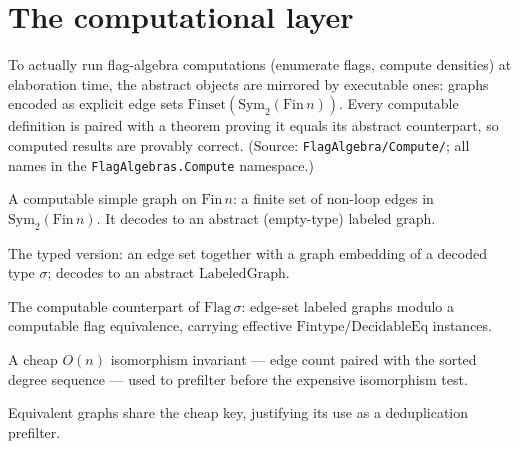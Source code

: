 \chapter{The computational layer}
\label{chap:compute}

To actually run flag-algebra computations (enumerate flags, compute densities) at
elaboration time, the abstract objects are mirrored by executable ones: graphs
encoded as explicit edge sets $\mathrm{Finset}(\mathrm{Sym}_2(\mathrm{Fin}\,n))$.
Every computable definition is paired with a theorem proving it equals its
abstract counterpart, so computed results are provably correct. (Source:
\texttt{FlagAlgebra/Compute/}; all names in the \texttt{FlagAlgebras.Compute}
namespace.)

\begin{definition}
  \label{def:sym2-graph}
  \leanok
  A computable simple graph on $\mathrm{Fin}\,n$: a finite set of non-loop edges
  in $\mathrm{Sym}_2(\mathrm{Fin}\,n)$. It decodes to an abstract
  (empty-type) labeled graph.
\end{definition}

\begin{definition}
  \label{def:sym2-labeled-graph}
  \leanok
  The typed version: an edge set together with a graph embedding of a decoded
  type $\sigma$; decodes to an abstract $\mathrm{LabeledGraph}$.
\end{definition}

\begin{definition}
  \label{def:sym2-flag}
  \leanok
  The computable counterpart of $\mathrm{Flag}\,\sigma$: edge-set labeled graphs
  modulo a computable flag equivalence, carrying effective
  $\mathrm{Fintype}$/$\mathrm{DecidableEq}$ instances.
\end{definition}

\begin{definition}
  \label{def:deg-key}
  \leanok
  A cheap $O(n)$ isomorphism invariant --- edge count paired with the sorted
  degree sequence --- used to prefilter before the expensive isomorphism test.
\end{definition}

\begin{theorem}
  \label{thm:deg-key-iso-invariant}
  \leanok
  Equivalent graphs share the cheap key, justifying its use as a deduplication
  prefilter.
\end{theorem}

